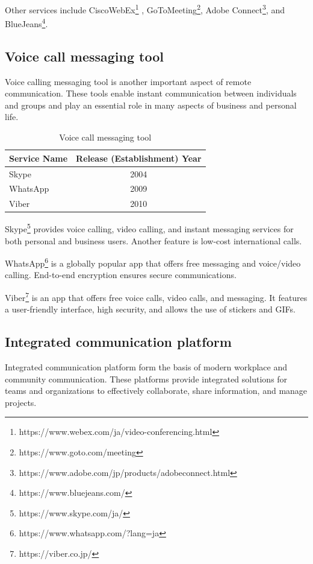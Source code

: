 \documentclass[12pt]{article}
\begin{document}
Other services include
CiscoWebEx\footnote{https://www.webex.com/ja/video-conferencing.html} ,
GoToMeeting\footnote{https://www.goto.com/meeting}, Adobe
Connect\footnote{https://www.adobe.com/jp/products/adobeconnect.html}, and
BlueJeans\footnote{https://www.bluejeans.com/}.

\subsection{Voice call messaging tool}
Voice calling messaging tool is another important aspect of remote
communication. These tools enable instant communication between individuals and
groups and play an essential role in many aspects of business and personal
life.

\begin{table}[h]
    \begin{center}
        \begin{tabular}{|l|c|} \hline
            Service Name & Release (Establishment) Year \\ \hline
            Skype        & 2004                         \\
            WhatsApp     & 2009                         \\
            Viber        & 2010                         \\ \hline
        \end{tabular}
        \caption{Voice call messaging tool}
    \end{center}
\end{table}

Skype\footnote{https://www.skype.com/ja/} provides voice calling, video
calling, and instant messaging services for
both personal and business users. Another feature is low-cost international
calls.

WhatsApp\footnote{https://www.whatsapp.com/?lang=ja} is a globally popular app
that offers free messaging and voice/video
calling. End-to-end encryption ensures secure communications.

Viber\footnote{https://viber.co.jp/} is an app that offers free voice calls,
video calls, and messaging. It
features a user-friendly interface, high security, and allows the use of
stickers and GIFs.

\subsection{Integrated communication platform}
Integrated communication platform form the basis of modern workplace and
community communication. These platforms provide integrated solutions for teams
and organizations to effectively collaborate, share information, and manage
projects.
\end{document}
